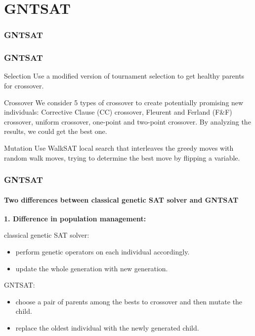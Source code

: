 \section{GNTSAT}

\begin{frame}
	\frametitle{GNTSAT}
\begin{small}
	\renewcommand{\thealgocf}{}
	\begin{algorithm}[H]
		\SetAlgoLined
		\BlankLine
		\caption{GNTSAT solver}
	\end{algorithm}
\end{small}
\end{frame}


\begin{frame}
	\frametitle{GNTSAT}
	\begin{block}{Selection}
		Use a modified version of tournament selection to get healthy parents for crossover.
	\end{block}
	\begin{block}{Crossover}
	We consider 5 types of crossover to create potentially promising new individuals: Corrective Clause (CC) crossover,
	Fleurent and Ferland (F\&F) crossover, uniform crossover, one-point and two-point crossover. By analyzing the results, we could get the best one.
	\end{block}
	\begin{block}{Mutation}
		Use WalkSAT local search that interleaves the greedy moves with random walk moves, trying to determine the best move by flipping a variable.
	\end{block}
\end{frame}
\begin{frame}[t]
	\frametitle{GNTSAT}
	\framesubtitle{Two differences between classical genetic SAT solver and GNTSAT}
	\textbf{1. Difference in population management:}
	\begin{alertblock}{classical genetic SAT solver:}
		\begin{itemize}
		\item perform genetic operators on each individual accordingly.
		\item update the whole generation with new generation.
		\end{itemize}
	\end{alertblock}
	\begin{alertblock}{GNTSAT:}		
		\begin{itemize}
		\item choose a pair of parents among the bests to crossover and then mutate the child. 
		\item replace the oldest individual with the newly generated child.
		\end{itemize}	
	\end{alertblock}
\end{frame}

